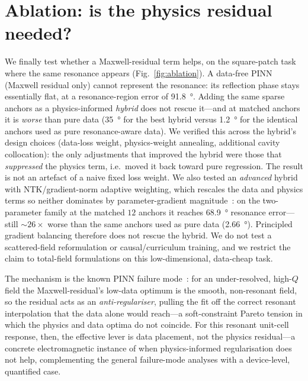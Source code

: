 \documentclass[11pt]{article}
\begin{document}
\section{Ablation: is the physics residual needed?}\label{sec:abl}
We finally test whether a Maxwell-residual term helps, on the square-patch task where the same resonance
appears (Fig.~\ref{fig:ablation}). A data-free PINN (Maxwell residual only) cannot represent the
resonance: its reflection phase stays essentially flat, at a resonance-region error of
\SI{91.8}{\degree}. Adding the same sparse anchors as a physics-informed \emph{hybrid} does not rescue
it---and at matched anchors it is \emph{worse} than pure data (\SI{35}{\degree} for the best hybrid
versus \SI{1.2}{\degree} for the identical anchors used as pure resonance-aware data). We verified this
across the hybrid's design choices (data-loss weight, physics-weight annealing, additional cavity
collocation): the only adjustments that improved the hybrid were those that \emph{suppressed} the
physics term, i.e.\ moved it back toward pure regression. The result is not an artefact of a naive
fixed loss weight. We also tested an \emph{advanced} hybrid with NTK/gradient-norm adaptive weighting,
which rescales the data and physics terms so neither dominates by parameter-gradient
magnitude~\cite{wanggrad2021}: on the two-parameter family at the matched $12$ anchors it reaches
\SI{68.9}{\degree} resonance error---still $\sim\!26\times$ worse than the same anchors used as pure data
(\SI{2.66}{\degree}). Principled gradient balancing therefore does not rescue the hybrid. We do not test a
scattered-field reformulation or causal/curriculum training, and we restrict the claim to total-field
formulations on this low-dimensional, data-cheap task.

The mechanism is the known PINN failure
mode~\cite{krishnapriyan2021}: for an under-resolved, high-$Q$ field the
Maxwell-residual's low-data optimum is the smooth, non-resonant field, so the residual acts as an
\emph{anti-regulariser}, pulling the fit off the correct resonant interpolation that the data alone
would reach---a soft-constraint Pareto tension in which the physics and data optima do not coincide.
For this resonant unit-cell response, then, the effective lever is data placement, not the physics
residual---a concrete electromagnetic instance of when physics-informed regularisation does not help,
complementing the general failure-mode analyses with a device-level, quantified case.
\end{document}
